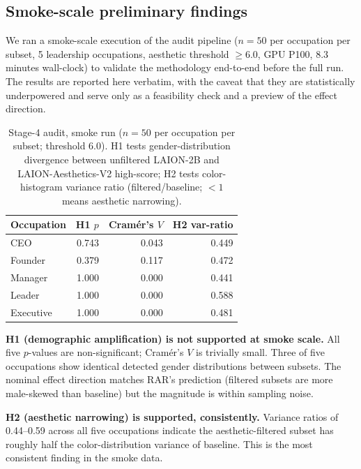 \documentclass[sigconf,nonacm]{acmart}
\begin{document}
\subsection{Smoke-scale preliminary findings}
\label{sec:smoke}

We ran a smoke-scale execution of the audit pipeline (\(n=50\) per occupation per subset, 5 leadership occupations, aesthetic threshold \(\geq 6.0\), GPU P100, 8.3 minutes wall-clock) to validate the methodology end-to-end before the full run. The results are reported here verbatim, with the caveat that they are statistically underpowered and serve only as a feasibility check and a preview of the effect direction.

\begin{table}[t]
\centering
\small
\begin{tabular}{lrrr}
\toprule
Occupation & H1 \(p\) & Cramér's \(V\) & H2 var-ratio \\
\midrule
CEO       & 0.743 & 0.043 & 0.449 \\
Founder   & 0.379 & 0.117 & 0.472 \\
Manager   & 1.000 & 0.000 & 0.441 \\
Leader    & 1.000 & 0.000 & 0.588 \\
Executive & 1.000 & 0.000 & 0.481 \\
\bottomrule
\end{tabular}
\caption{Stage-4 audit, smoke run (\(n=50\) per occupation per subset; threshold 6.0). H1 tests gender-distribution divergence between unfiltered LAION-2B and LAION-Aesthetics-V2 high-score; H2 tests color-histogram variance ratio (filtered/baseline; \(<1\) means aesthetic narrowing).}
\label{tab:smoke}
\end{table}

\textbf{H1 (demographic amplification) is not supported at smoke scale.} All five \(p\)-values are non-significant; Cramér's \(V\) is trivially small. Three of five occupations show identical detected gender distributions between subsets. The nominal effect direction matches RAR's prediction (filtered subsets are more male-skewed than baseline) but the magnitude is within sampling noise.

\textbf{H2 (aesthetic narrowing) is supported, consistently.} Variance ratios of 0.44--0.59 across all five occupations indicate the aesthetic-filtered subset has roughly half the color-distribution variance of baseline. This is the most consistent finding in the smoke data.
\end{document}
